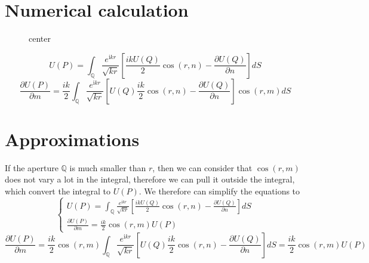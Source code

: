 \documentclass[12pt,twoside,english]{book}
\renewcommand{\~}{\perispomeni}%
\numberwithin{equation}{section}
\numberwithin{figure}{section}
\begin{document}
\section{Numerical calculation}


%
\begin{figure}[h]
center{}\caption{}
\end{figure}
\begin{equation}
U\left(P\right)=\int_{\mathbb{Q}}\frac{e^{\text{i}kr}}{\sqrt{kr}}\left[\frac{ikU\left(Q\right)}{2}\cos\left(r,n\right)-\frac{\partial U\left(Q\right)}{\partial n}\right]dS\end{equation}
\begin{equation}
\frac{\partial U\left(P\right)}{\partial m}=\frac{ik}{2}\int_{\mathbb{Q}}\frac{e^{\text{i}kr}}{\sqrt{kr}}\left[U\left(Q\right)\frac{ik}{2}\cos\left(r,n\right)-\frac{\partial U\left(Q\right)}{\partial n}\right]\cos\left(r,m\right)dS\end{equation}
\section{Approximations}

If the aperture $\mathbb{Q}$ is much smaller than $r$, then we can
consider that $\cos\left(r,m\right)$ does not vary a lot in the integral,
therefore we can pull it outside the integral, which convert the integral
to $U\left(P\right)$. We therefore can simplify the equations to\begin{equation}
\begin{cases}
U\left(P\right)=\int_{\mathbb{Q}}\frac{e^{\text{i}kr}}{\sqrt{kr}}\left[\frac{ikU\left(Q\right)}{2}\cos\left(r,n\right)-\frac{\partial U\left(Q\right)}{\partial n}\right]dS\\
\frac{\partial U\left(P\right)}{\partial m}=\frac{ik}{2}\cos\left(r,m\right)U\left(P\right)\end{cases}\end{equation}
\begin{equation}
\frac{\partial U\left(P\right)}{\partial m}=\frac{ik}{2}\cos\left(r,m\right)\int_{\mathbb{Q}}\frac{e^{\text{i}kr}}{\sqrt{kr}}\left[U\left(Q\right)\frac{ik}{2}\cos\left(r,n\right)-\frac{\partial U\left(Q\right)}{\partial n}\right]dS=\frac{ik}{2}\cos\left(r,m\right)U\left(P\right)\end{equation}
\end{document}
